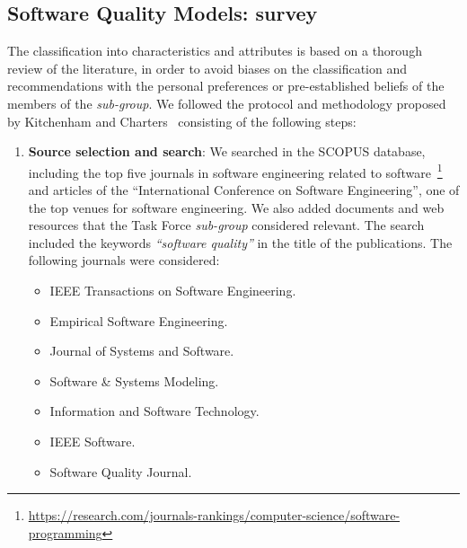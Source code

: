 \subsection{Software Quality Models: survey}
\label{subsec:sqm_survey}

The classification into characteristics and attributes is based on a thorough review of the literature, in order to avoid biases on the classification and recommendations with the personal preferences or pre-established beliefs of the members of the \textit{sub-group}. We followed the protocol and methodology proposed by Kitchenham and Charters~\cite{keele2007guidelines} consisting of the following steps:

\begin{enumerate}
    \item \textbf{Source selection and search}: We searched in the SCOPUS database, including the top five journals in software engineering related to software~\footnote{\url{https://research.com/journals-rankings/computer-science/software-programming}} and articles of the  ``International Conference on Software Engineering'', one of the top venues for software engineering. We also added documents and web resources that the Task Force \textit{sub-group} considered relevant. The search included the keywords \textit{``software quality''} in the title of the publications. The following journals were considered:

    \begin{itemize}
        \item IEEE Transactions on Software Engineering.
        \item Empirical Software Engineering.
        \item Journal of Systems and Software.
        \item Software \& Systems Modeling.
        \item Information and Software Technology.
        \item IEEE Software.
        \item Software Quality Journal.
    \end{itemize}


\end{enumerate}
